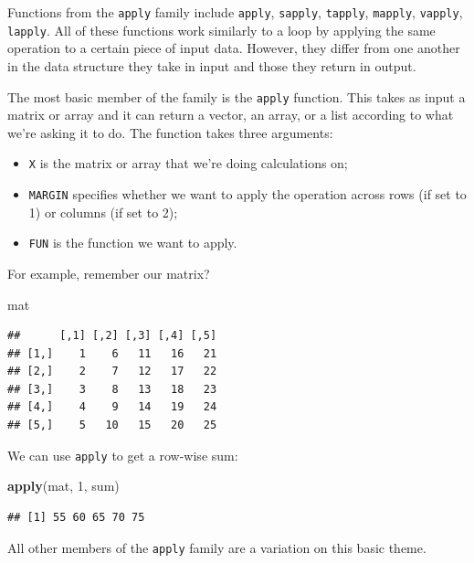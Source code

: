 \documentclass[
]{book}
\newenvironment{Shaded}{\begin{snugshade}}{\end{snugshade}}
\newcommand{\DecValTok}[1]{\textcolor[rgb]{0.00,0.00,0.81}{#1}}
\newcommand{\FunctionTok}[1]{\textcolor[rgb]{0.13,0.29,0.53}{\textbf{#1}}}
\newcommand{\NormalTok}[1]{#1}
\providecommand{\tightlist}{%
  \setlength{\itemsep}{0pt}\setlength{\parskip}{0pt}}
\begin{document}
Functions from the \texttt{apply} family include \texttt{apply}, \texttt{sapply}, \texttt{tapply}, \texttt{mapply},
\texttt{vapply}, \texttt{lapply}. All of these functions work similarly to a loop by applying
the same operation to a certain piece of input data. However, they differ from
one another in the data structure they take in input and those they return in
output.

The most basic member of the family is the \texttt{apply} function. This takes as input
a matrix or array and it can return a vector, an array, or a list according to
what we're asking it to do. The function takes three arguments:

\begin{itemize}
\tightlist
\item
  \texttt{X} is the matrix or array that we're doing calculations on;
\item
  \texttt{MARGIN} specifies whether we want to apply the operation across rows (if set
  to 1) or columns (if set to 2);
\item
  \texttt{FUN} is the function we want to apply.
\end{itemize}

For example, remember our matrix?

\begin{Shaded}
\begin{Highlighting}[]
\NormalTok{mat}
\end{Highlighting}
\end{Shaded}

\begin{verbatim}
##      [,1] [,2] [,3] [,4] [,5]
## [1,]    1    6   11   16   21
## [2,]    2    7   12   17   22
## [3,]    3    8   13   18   23
## [4,]    4    9   14   19   24
## [5,]    5   10   15   20   25
\end{verbatim}

We can use \texttt{apply} to get a row-wise sum:

\begin{Shaded}
\begin{Highlighting}[]
\FunctionTok{apply}\NormalTok{(mat, }\DecValTok{1}\NormalTok{, sum)}
\end{Highlighting}
\end{Shaded}

\begin{verbatim}
## [1] 55 60 65 70 75
\end{verbatim}

All other members of the \texttt{apply} family are a variation on this basic theme.
\end{document}
